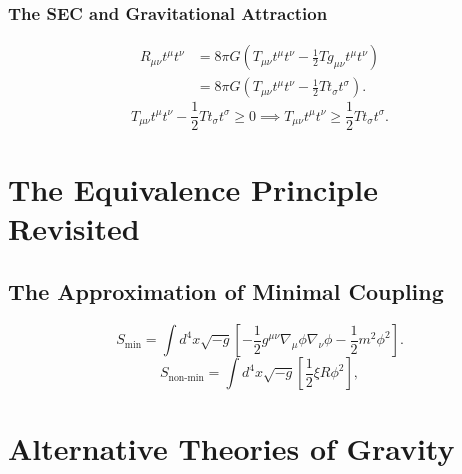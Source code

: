 \documentclass[11pt, a4paper]{report}
\begin{document}
\subsubsection*{The SEC and Gravitational Attraction}
\begin{align}
R_{\mu\nu} t^{\mu} t^{\nu} &= 8\pi G \left( T_{\mu\nu} t^{\mu} t^{\nu} - \frac{1}{2} T g_{\mu\nu} t^{\mu} t^{\nu} \right) \nonumber \\
&= 8\pi G \left( T_{\mu\nu} t^{\mu} t^{\nu} - \frac{1}{2} T t_{\sigma} t^{\sigma} \right).
\end{align}
\begin{equation}
T_{\mu\nu} t^{\mu} t^{\nu} - \frac{1}{2} T t_{\sigma} t^{\sigma} \ge 0 \implies T_{\mu\nu} t^{\mu} t^{\nu} \ge \frac{1}{2} T t_{\sigma} t^{\sigma}.
\end{equation}

\section{The Equivalence Principle Revisited}
\subsection{The Approximation of Minimal Coupling}
\begin{equation}
\label{eq:minimal_scalar}
S_{\text{min}} = \int d^{4}x \sqrt{-g} \left[ -\frac{1}{2} g^{\mu\nu} \nabla_{\mu}\phi \nabla_{\nu}\phi - \frac{1}{2}m^{2}\phi^{2} \right].
\end{equation}
\begin{equation}
\label{eq:nonminimal_scalar}
S_{\text{non-min}} = \int d^{4}x \sqrt{-g} \left[ \frac{1}{2} \xi R \phi^{2} \right],
\end{equation}

\section{Alternative Theories of Gravity}
\end{document}
